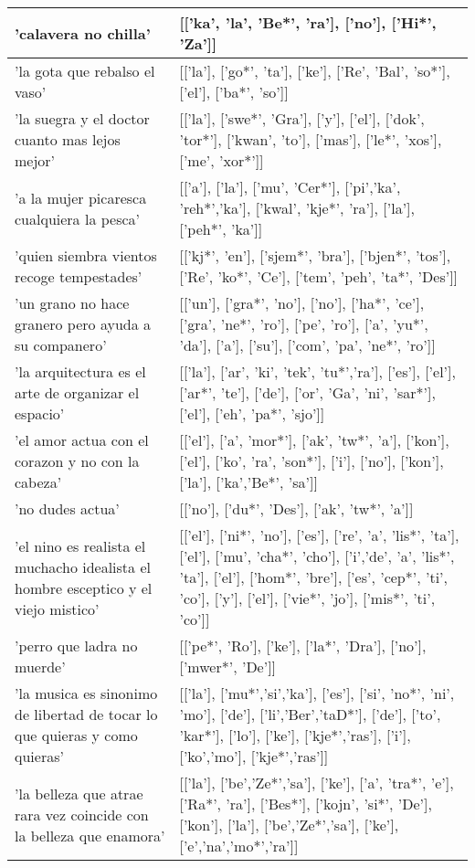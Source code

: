 \begin{longtable}{| p{} | p{} |}
'calavera no chilla' & [['ka', 'la', 'Be*', 'ra'], ['no'], ['Hi*', 'Za']] \\ \hline
'la gota que rebalso el vaso' & [['la'], ['go*', 'ta'], ['ke'], ['Re', 'Bal', 'so*'], ['el'], ['ba*', 'so']] \\ \hline
'la suegra y el doctor cuanto mas lejos mejor' & [['la'], ['swe*', 'Gra'], ['y'], ['el'], ['dok', 'tor*'], ['kwan', 'to'], ['mas'], ['le*', 'xos'], ['me', 'xor*']] \\ \hline
'a la mujer picaresca cualquiera la pesca' & [['a'], ['la'], ['mu', 'Cer*'], ['pi','ka', 'reh*','ka'], ['kwal', 'kje*', 'ra'], ['la'], ['peh*', 'ka']] \\ \hline
'quien siembra vientos recoge tempestades' & [['kj*', 'en'], ['sjem*', 'bra'], ['bjen*', 'tos'], ['Re', 'ko*', 'Ce'], ['tem', 'peh', 'ta*', 'Des']] \\ \hline
'un grano no hace granero pero ayuda a su companero' & [['un'], ['gra*', 'no'], ['no'], ['ha*', 'ce'], ['gra', 'ne*', 'ro'], ['pe', 'ro'], ['a', 'yu*', 'da'], ['a'], ['su'], ['com', 'pa', 'ne*', 'ro']] \\ \hline
'la arquitectura es el arte de organizar el espacio' & [['la'], ['ar', 'ki', 'tek', 'tu*','ra'], ['es'], ['el'], ['ar*', 'te'], ['de'], ['or', 'Ga', 'ni', 'sar*'], ['el'], ['eh', 'pa*', 'sjo']] \\ \hline
'el amor actua con el corazon y no con la cabeza' & [['el'], ['a', 'mor*'], ['ak', 'tw*', 'a'], ['kon'], ['el'], ['ko', 'ra', 'son*'], ['i'], ['no'], ['kon'], ['la'], ['ka','Be*', 'sa']] \\ \hline
'no dudes actua' & [['no'], ['du*', 'Des'], ['ak', 'tw*', 'a']] \\ \hline
'el nino es realista el muchacho idealista el hombre esceptico y el viejo mistico' & [['el'], ['ni*', 'no'], ['es'], ['re', 'a', 'lis*', 'ta'], ['el'], ['mu', 'cha*', 'cho'], ['i','de', 'a', 'lis*', 'ta'], ['el'], ['hom*', 'bre'], ['es', 'cep*', 'ti', 'co'], ['y'], ['el'], ['vie*', 'jo'], ['mis*', 'ti', 'co']] \\ \hline
'perro que ladra no muerde' & [['pe*', 'Ro'], ['ke'], ['la*', 'Dra'], ['no'], ['mwer*', 'De']] \\ \hline
'la musica es sinonimo de libertad de tocar lo que quieras y como quieras' & [['la'], ['mu*','si','ka'], ['es'], ['si', 'no*', 'ni', 'mo'], ['de'], ['li','Ber','taD*'], ['de'], ['to', 'kar*'], ['lo'], ['ke'], ['kje*','ras'], ['i'], ['ko','mo'], ['kje*','ras']] \\ \hline
'la belleza que atrae rara vez coincide con la belleza que enamora' & [['la'], ['be','Ze*','sa'], ['ke'], ['a', 'tra*', 'e'], ['Ra*', 'ra'], ['Bes*'], ['kojn', 'si*', 'De'], ['kon'], ['la'], ['be','Ze*','sa'], ['ke'], ['e','na','mo*','ra']] \\ \hline

\end{longtable}
